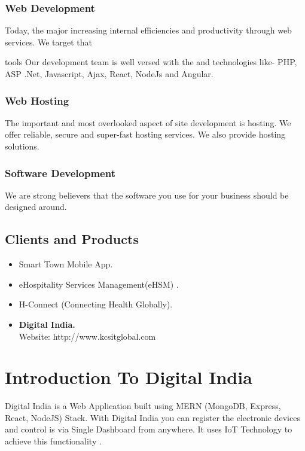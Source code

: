 

\subsubsection{Web Development }
Today, the major increasing internal efficiencies and productivity through web services. We target that 

tools Our development team is well versed with the and technologies like- PHP, ASP .Net, Javascript, Ajax, React, NodeJs and Angular.


\subsubsection{Web Hosting }
The important and most overlooked aspect of site development is hosting. We offer reliable, secure and super-fast hosting services. We also provide hosting solutions.


\subsubsection{Software Development }
We are strong believers that the software you use for your business should be designed around.

\subsection{Clients and Products}
\begin{itemize} 


\item	Smart Town Mobile App. 
\item	eHospitality Services Management(eHSM) .
\item	H-Connect (Connecting Health Globally).
\item	\textbf{Digital India. }\\
          Website: http://www.kcsitglobal.com 
      
\end{itemize}




\section{Introduction To Digital India }
                             Digital India is a Web Application built using MERN (MongoDB, Express, React,
NodeJS) Stack. With Digital India you can register the electronic devices and control is
via Single Dashboard from anywhere.
It uses IoT Technology to achieve this functionality
                             .

